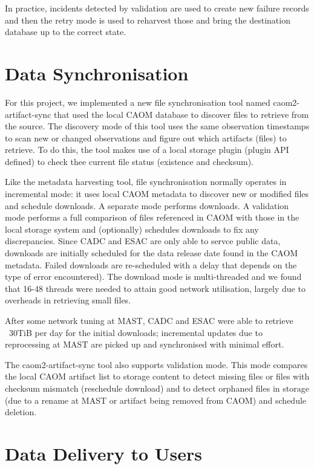 \documentclass[11pt,twoside]{article}
\begin{document}
In practice, incidents detected by validation are used to create new failure records and then the retry mode is used to reharvest those and bring the destination database up to the correct state.

\section{Data Synchronisation}

For this project, we implemented a new file synchronisation tool named caom2-artifact-sync that used the local CAOM database to discover files to retrieve from the source. The discovery mode of this tool uses the same observation timestamps to scan new or changed observations and figure out which artifacts (files) to retrieve. To do this, the tool makes use of a local storage plugin (plugin API defined) to check thee current file status (existence and checksum).

Like the metadata harvesting tool, file synchronisation normally operates in incremental mode: it uses local CAOM metadata to discover new or modified files and schedule downloads. A separate mode performs downloads. A validation mode performs a full comparison of files referenced in CAOM with those in the local storage system and (optionally) schedules downloads to fix any discrepancies. Since CADC and ESAC are only able to servce public data, downloads are initially scheduled for the data release date found in the CAOM metadata. Failed downloads are re-scheduled with a delay that depends on the type of error encountered). The download mode is multi-threaded and we found that 16-48 threads were needed to attain good network utilisation, largely due to overheads in retrieving small files.

After some network tuning at MAST, CADC and ESAC were able to retrieve ~30TiB per day for the initial downloads; incremental updates due to reprocessing at MAST are picked up and synchronised with minimal effort.

The caom2-artifact-sync tool also supports validation mode. This mode compares the local CAOM artifact list to storage content to detect missing files or files with checksum mismatch (reschedule download) and to detect orphaned files in storage (due to a rename at MAST or artifact being removed from CAOM) and schedule deletion.

\section{Data Delivery to Users}
\end{document}
